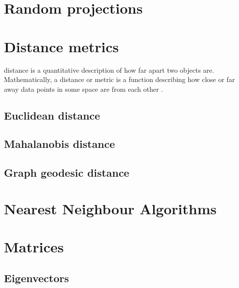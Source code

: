\section{Random projections}

\section{Distance metrics}
\gls{distance} is a quantitative description of how far apart two objects are. 
Mathematically, a \gls{distance} or \gls{metric} is a function describing how 
close or far away data points in some space are from each other \cite{KHOA12}.

\subsection{Euclidean distance}
\subsection{Mahalanobis distance}
\subsection{Graph geodesic distance}

\section{Nearest Neighbour Algorithms}

\section{Matrices}

\subsection{Eigenvectors}

